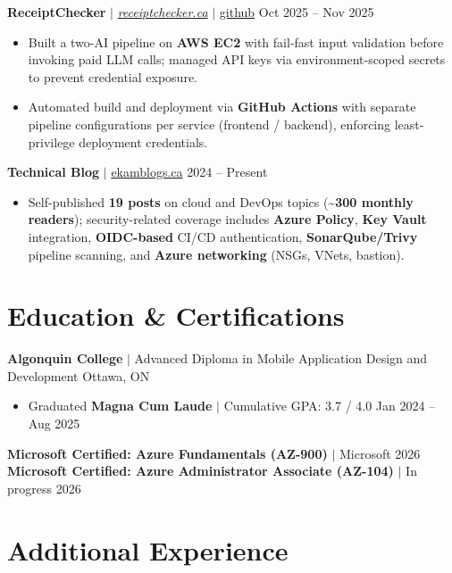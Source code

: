 \documentclass[11pt,a4paper]{article}
\begin{document}
\vspace{4pt}

\textbf{ReceiptChecker} $|$ \href{https://receiptchecker.ca/}{\emph{receiptchecker.ca}} $|$ \href{https://github.com/bhat0155/receipt-check}{\small github} \hfill Oct 2025 -- Nov 2025
\begin{itemize}
    \item Built a two-AI pipeline on \textbf{AWS EC2} with fail-fast input validation before invoking paid LLM calls; managed API keys via environment-scoped secrets to prevent credential exposure.
    \item Automated build and deployment via \textbf{GitHub Actions} with separate pipeline configurations per service (frontend / backend), enforcing least-privilege deployment credentials.
\end{itemize}

\vspace{4pt}

\textbf{Technical Blog} $|$ \href{https://www.ekamblogs.ca}{ekamblogs.ca} \hfill 2024 -- Present
\begin{itemize}
    \item Self-published \textbf{19 posts} on cloud and DevOps topics (\textasciitilde\textbf{300 monthly readers}); security-related coverage includes \textbf{Azure Policy}, \textbf{Key Vault} integration, \textbf{OIDC-based} CI/CD authentication, \textbf{SonarQube/Trivy} pipeline scanning, and \textbf{Azure networking} (NSGs, VNets, bastion).
\end{itemize}

\section{Education \& Certifications}

\textbf{Algonquin College} $|$ Advanced Diploma in Mobile Application Design and Development \hfill Ottawa, ON
\begin{itemize}
    \item Graduated \textbf{Magna Cum Laude} $|$ Cumulative GPA: 3.7 / 4.0 \hfill Jan 2024 -- Aug 2025
\end{itemize}
\textbf{Microsoft Certified: Azure Fundamentals (AZ-900)} $|$ Microsoft \hfill 2026 \\
\textbf{Microsoft Certified: Azure Administrator Associate (AZ-104)} $|$ In progress \hfill 2026

\section{Additional Experience}
\end{document}
